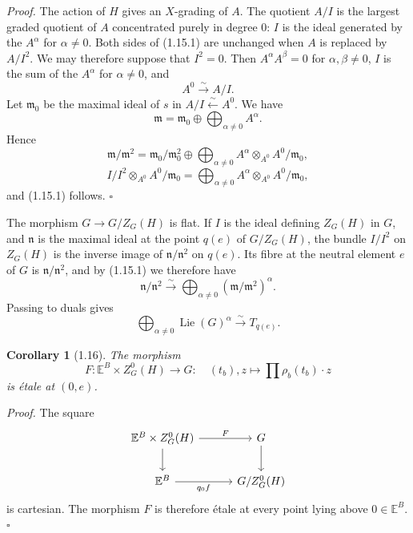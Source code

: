 \documentclass[10pt]{article}
\newcommand{\Lie}{\operatorname{Lie}}
\theoremstyle{deligne}
\newtheorem*{corollary*}{Corollary}
\newenvironment{proofdel}{\textit{Proof.}}{\hfill$\square$}
\newcommand{\heading}[1]{\vspace{0.7em}\noindent{\bfseries #1}\quad}
\begin{document}
\begin{proofdel}
The action of \(H\) gives an \(X\)-grading of \(A\). The quotient \(A/I\) is the largest graded quotient of \(A\) concentrated purely in degree \(0\): \(I\) is the ideal generated by the \(A^\alpha\) for \(\alpha\ne0\). Both sides of (1.15.1) are unchanged when \(A\) is replaced by \(A/I^2\). We may therefore suppose that \(I^2=0\). Then \(A^\alpha A^\beta=0\) for \(\alpha,\beta\ne0\), \(I\) is the sum of the \(A^\alpha\) for \(\alpha\ne0\), and
\[
  A^0\overset{\sim}{\longrightarrow}A/I.
\]
Let \(\mathfrak m_0\) be the maximal ideal of \(s\) in \(A/I\overset{\sim}{\leftarrow}A^0\). We have
\[
  \mathfrak m=\mathfrak m_0\oplus\bigoplus_{\alpha\ne0}A^\alpha .
\]
Hence
\[
  \mathfrak m/\mathfrak m^2 =
  \mathfrak m_0/\mathfrak m_0^2\oplus
  \bigoplus_{\alpha\ne0} A^\alpha\otimes_{A^0} A^0/\mathfrak m_0,
\]
\[
  I/I^2\otimes_{A^0}A^0/\mathfrak m_0 =
  \bigoplus_{\alpha\ne0} A^\alpha\otimes_{A^0} A^0/\mathfrak m_0,
\]
and (1.15.1) follows.
\end{proofdel}

\heading{End of the proof of 1.14.} The morphism \(G\to G/Z_G(H)\) is flat. If \(I\) is the ideal defining \(Z_G(H)\) in \(G\), and \(\mathfrak n\) is the maximal ideal at the point \(q(e)\) of \(G/Z_G(H)\), the bundle \(I/I^2\) on \(Z_G(H)\) is the inverse image of \(\mathfrak n/\mathfrak n^2\) on \(q(e)\). Its fibre at the neutral element \(e\) of \(G\) is \(\mathfrak n/\mathfrak n^2\), and by (1.15.1) we therefore have
\[
  \mathfrak n/\mathfrak n^2 \overset{\sim}{\longrightarrow}
  \bigoplus_{\alpha\ne0}(\mathfrak m/\mathfrak m^2)^\alpha .
\]
Passing to duals gives
\[
  \bigoplus_{\alpha\ne0}\Lie(G)^\alpha \overset{\sim}{\longrightarrow} T_{q(e)} .
\]

\begin{corollary*}[1.16]
The morphism
\[
  F:\mathbb E^B\times Z^0_G(H)\longrightarrow G:\quad
  (t_b),z\longmapsto \prod\rho_b(t_b)\cdot z
\]
is étale at \((0,e)\).
\end{corollary*}

\begin{proofdel}
The square
\[
\begin{tikzcd}[column sep=3em,row sep=2em]
\mathbb E^B\times Z^0_G(H) \arrow[r,"F"] \arrow[d] & G \arrow[d]\\
\mathbb E^B \arrow[r,"q_0f"'] & G/Z^0_G(H)
\end{tikzcd}
\]
is cartesian. The morphism \(F\) is therefore étale at every point lying above \(0\in\mathbb E^B\).
\end{proofdel}
\end{document}
